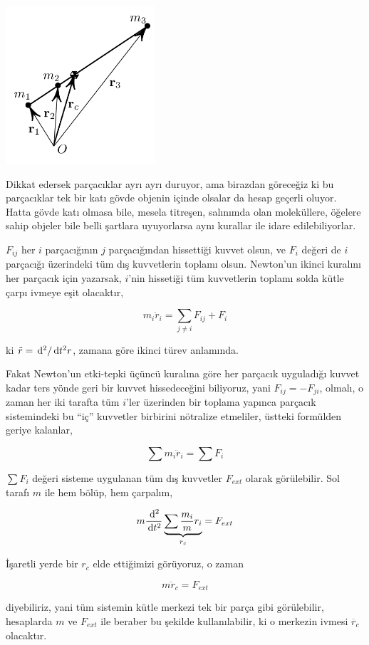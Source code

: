 \documentclass[12pt,fleqn]{article}\usepackage{../../common}
\begin{document}
\includegraphics[width=15em]{phy_005_basics_08.png}

Dikkat edersek parçacıklar ayrı ayrı duruyor, ama birazdan göreceğiz ki bu
parçacıklar tek bir katı gövde objenin içinde olsalar da hesap geçerli
oluyor. Hatta gövde katı olmasa bile, mesela titreşen, salınımda olan
moleküllere, öğelere sahip objeler bile belli şartlara uyuyorlarsa aynı kurallar
ile idare edilebiliyorlar.

$F_{ij}$ her $i$ parçacığının $j$ parçacığından hissettiği kuvvet olsun, ve
$F_i$ değeri de $i$ parçacığı üzerindeki tüm dış kuvvetlerin toplamı olsun. Newton'un
ikinci kuralını her parçacık için yazarsak, $i$'nin hissetiği tüm kuvvetlerin
toplamı solda kütle çarpı ivmeye eşit olacaktır,

$$
m_i \ddot{r}_i = \sum _{j \ne i} F_{ij} + F_i
$$

ki $\ddot{r} = \,\mathrm{d}^2 / \,\mathrm{d} t^2 r$, zamana göre ikinci türev anlamında.

Fakat Newton'un etki-tepki üçüncü kuralına göre her parçacık uyguladığı kuvvet
kadar ters yönde geri bir kuvvet hissedeceğini biliyoruz, yani $F_{ij} =
-F_{ji}$, olmalı, o zaman her iki tarafta tüm $i$'ler üzerinden bir toplama
yapınca parçacık sistemindeki bu ``iç'' kuvvetler birbirini nötralize etmeliler,
üstteki formülden geriye kalanlar,

$$
\sum m_i \ddot{r}_i =  \sum F_i
$$

$\sum F_i$ değeri sisteme uygulanan tüm dış kuvvetler $F_{ext}$ olarak
görülebilir. Sol tarafı $m$ ile hem bölüp, hem çarpalım,

$$
m \frac{\,\mathrm{d}^2}{\,\mathrm{d} t^2} \underbrace{\sum \frac{m_i}{m} r_i}_{r_c} =
F_{ext}
$$

İşaretli yerde bir $r_c$ elde ettiğimizi görüyoruz, o zaman 

$$
m\ddot{r}_c = F_{ext}
$$

diyebiliriz, yani tüm sistemin kütle merkezi tek bir parça gibi görülebilir,
hesaplarda $m$ ve $F_{ext}$ ile beraber bu şekilde kullanılabilir, ki
o merkezin ivmesi $\ddot{r_c}$ olacaktır.
\end{document}

